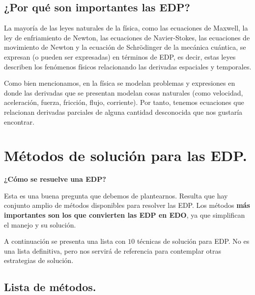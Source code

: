\documentclass[12pt]{article}
\numberwithin{equation}{section}
\begin{document}
\subsection{¿Por qué son importantes las EDP?}

La mayoría de las leyes naturales de la física, como las ecuaciones de Maxwell, la ley de enfriamiento de Newton, las ecuaciones de Navier-Stokes, las ecuaciones de movimiento de Newton y la ecuación de Schrödinger de la mecánica cuántica, se expresan (o pueden ser expresadas) en términos de EDP, es decir, estas leyes describen los fenómenos físicos relacionando las derivadas espaciales y temporales.
\par
Como bien mencionamos, en la física se modelan problemas y expresiones en donde las derivadas que se presentan modelan cosas naturales (como velocidad, aceleración, fuerza, fricción, flujo, corriente). Por tanto, tenemos ecuaciones que relacionan derivadas parciales de alguna cantidad desconocida que nos gustaría encontrar.


\section{Métodos de solución para las EDP.}

\textbf{¿Cómo se resuelve una EDP?}

Esta es una buena pregunta que debemos de plantearnos. Resulta que hay conjunto amplio de métodos disponibles para resolver las EDP. Los métodos \textbf{más importantes son los que convierten las EDP en EDO}, ya que simplifican el manejo y su solución.
\par
A continuación se presenta una lista con $10$ técnicas de solución para EDP. No es una lista definitiva, pero nos servirá de referencia para contemplar otras estrategias de solución.

\subsection{Lista de métodos.}
\end{document}
